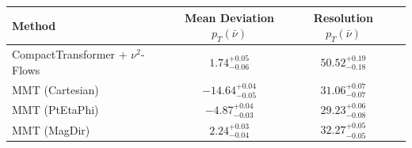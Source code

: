     \begin{tabular}{lccc}
        \toprule
        Method & Mean Deviation $p_{T}(\bar{\nu})$ & Resolution $p_{T}(\bar{\nu})$ \\
        \midrule
        CompactTransformer + $\nu^2$-Flows & $1.74^{+0.05}_{-0.06}$ & $50.52^{+0.19}_{-0.18}$ \\
        MMT (Cartesian) & $-14.64^{+0.04}_{-0.05}$ & $31.06^{+0.07}_{-0.07}$ \\
        MMT (PtEtaPhi) & $-4.87^{+0.04}_{-0.03}$ & $29.23^{+0.06}_{-0.08}$ \\
        MMT (MagDir) & $2.24^{+0.03}_{-0.04}$ & $32.27^{+0.05}_{-0.05}$ \\
        \bottomrule
    \end{tabular}